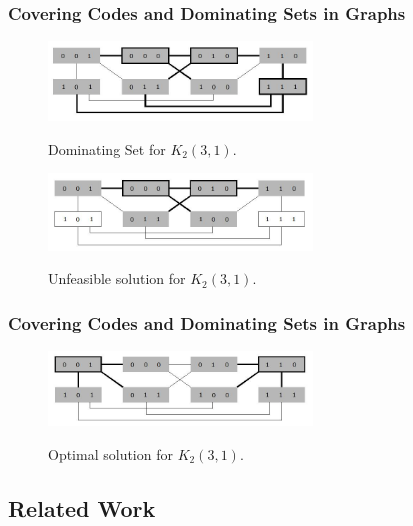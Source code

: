 \documentclass{beamer}
\begin{document}
\begin{frame}
  \frametitle{Covering Codes and Dominating Sets in Graphs}
{

\begin{figure}
	\centering
		\includegraphics[width=7cm]{images/s3.jpg}
	\label{fig:solucao}
	\caption{\footnotesize Dominating Set for $K_{2}(3,1)$.}
\end{figure}

\begin{figure}
	\centering
		\includegraphics[width=7cm]{images/s2.jpg}
	\label{fig:solucaoinviavel}
	\caption{\footnotesize Unfeasible solution for $K_{2}(3,1)$.}
\end{figure}

}
\end{frame}


\begin{frame}
  \frametitle{Covering Codes and Dominating Sets in Graphs}
{


\begin{figure}
	\centering
		\includegraphics[width=7cm]{images/s1.jpg}
	\label{fig:solucaootima}
	\caption{\footnotesize Optimal solution for $K_{2}(3,1)$.}
\end{figure}

}
\end{frame}

\subsection{Related Work}
\end{document}
